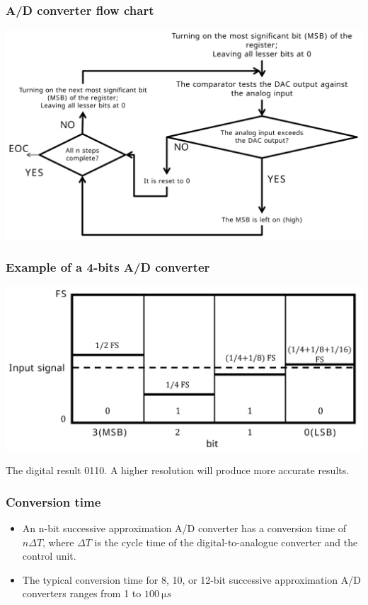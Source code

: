 \documentclass[11pt]{article}
\begin{document}
\subsubsection{A/D converter flow chart}
\label{sec:orga15b863}
\begin{center}
\includegraphics[width=.9\linewidth]{./images/a-d-converter-flow-chart.png}
\end{center}
\subsubsection{Example of a 4-bits A/D converter}
\label{sec:org7c12678}
\begin{center}
\includegraphics[width=.9\linewidth]{./images/4-bits-a-d-converter-example.png}
\end{center}

The digital result 0110. A higher resolution will produce more accurate results.

 \newpage
\subsubsection{Conversion time}
\label{sec:org4d3eb5f}
\begin{itemize}
\item An n-bit successive approximation A/D converter has a conversion time of \(n \Delta T\), where \(\Delta T\) is the cycle time of the digital-to-analogue converter and the control unit.
\item The typical conversion time for 8, 10, or 12-bit successive approximation A/D converters ranges from 1 to \(\qty{100}{\micro s}\)
\end{itemize}
\end{document}
